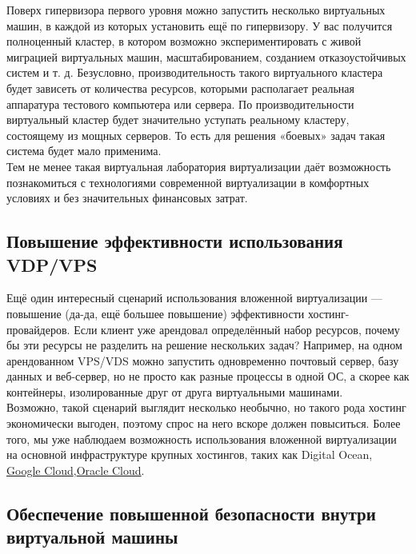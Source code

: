 \documentclass[14pt, a4paper]{article}
\begin{document}
Поверх гипервизора первого уровня можно запустить несколько виртуальных машин, в каждой из
которых установить ещё по гипервизору. У вас получится полноценный кластер, в котором возможно
экспериментировать с живой миграцией виртуальных машин, масштабированием, созданием
отказоустойчивых систем и т. д. Безусловно, производительность такого виртуального кластера будет
зависеть от количества ресурсов, которыми располагает реальная аппаратура тестового компьютера
или сервера. По производительности виртуальный кластер будет значительно уступать реальному
кластеру, состоящему из мощных серверов. То есть для решения «боевых» задач такая система будет
мало применима.\\

Тем не менее такая виртуальная лаборатория виртуализации даёт возможность познакомиться с
технологиями современной виртуализации в комфортных условиях и без значительных финансовых
затрат.

\subsection*{Повышение эффективности использования VDP/VPS}

Ещё один интересный сценарий использования вложенной виртуализации — повышение (да-да, ещё
большее повышение) эффективности хостинг-провайдеров. Если клиент уже арендовал
определённый набор ресурсов, почему бы эти ресурсы не разделить на решение нескольких задач?
Например, на одном арендованном VPS/VDS можно запустить одновременно почтовый сервер, базу
данных и веб-сервер, но не просто как разные процессы в одной ОС, а скорее как контейнеры,
изолированные друг от друга виртуальными машинами.\\

Возможно, такой сценарий выглядит несколько необычно, но такого рода хостинг экономически
выгоден, поэтому спрос на него вскоре должен повыситься. Более того, мы уже наблюдаем
возможность использования вложенной виртуализации на основной инфраструктуре крупных
хостингов, таких как Digital Ocean, \href{https://cloud.google.com/compute/docs/instances/nested-virtualization/overview}{Google Cloud},\href{https://community.oracle.com/hub/blogs/gmelo/2017/10/04/kvm-nested-virtualization-on-oracle-cloud-infrastructure}{Oracle Cloud}.

\subsection*{Обеспечение повышенной безопасности внутри
виртуальной машины}
\end{document}
